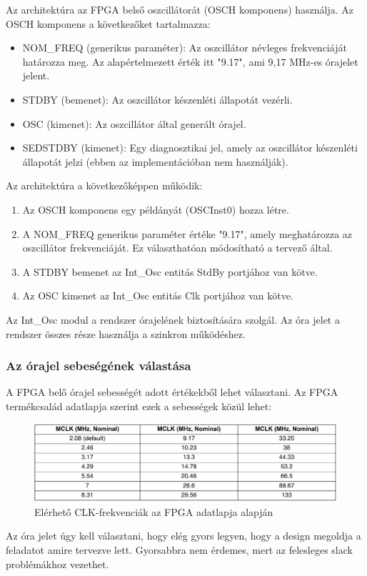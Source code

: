 \documentclass[a4paper,12pt,oneside]{book}
\begin{document}
Az architektúra az FPGA belső oszcillátorát (OSCH komponens) használja. Az OSCH komponens a következőket tartalmazza:

\begin{itemize}
	\item NOM\_FREQ (generikus paraméter): Az oszcillátor névleges frekvenciáját határozza meg. Az alapértelmezett érték itt "9.17", ami 9,17 MHz-es órajelet jelent.
	\item STDBY (bemenet): Az oszcillátor készenléti állapotát vezérli.
	\item OSC (kimenet): Az oszcillátor által generált órajel.
	\item SEDSTDBY (kimenet): Egy diagnosztikai jel, amely az oszcillátor készenléti állapotát jelzi (ebben az implementációban nem használják).
\end{itemize}

Az architektúra a következőképpen működik:

\begin{enumerate}
	\item Az OSCH komponens egy példányát (OSCInst0) hozza létre.
	\item A NOM\_FREQ generikus paraméter értéke "9.17", amely meghatározza az oszcillátor frekvenciáját. Ez választhatóan módosítható a tervező által.
	\item A STDBY bemenet az Int\_Osc entitás StdBy portjához van kötve.
	\item Az OSC kimenet az Int\_Osc entitás Clk portjához van kötve.
\end{enumerate}

Az Int\_Osc modul a rendszer órajelének biztosítására szolgál. Az óra jelet a rendszer összes része használja a szinkron működéshez.

\subsubsection{Az órajel sebeségének válastása}
A FPGA belő órajel sebességét  adott értékekből lehet választani. Az FPGA termékcsalád adatlapja szerint ezek a sebességek közül lehet:
\begin{figure}[H]
	\centering
	\includegraphics[trim=1mm 1mm 1mm 1mm,scale=0.344]{clkrates.PNG}
	\caption{Elérhető CLK-frekvenciák az FPGA adatlapja alapján \cite{fpgaadatlap}}
	\label{Elérhető CLK-frekvenciák az FPGA adatlapja alapján } 
\end{figure}
Az óra jelet úgy kell választani, hogy elég gyors legyen, hogy a design megoldja a feladatot amire tervezve lett. Gyorsabbra nem érdemes, mert az felesleges slack problémákhoz vezethet. 
\end{document}
